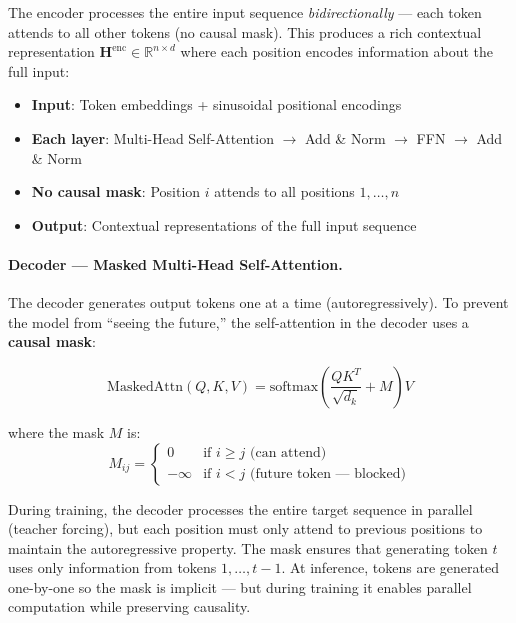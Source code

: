 The encoder processes the entire input sequence \emph{bidirectionally} --- each token attends to all other tokens (no causal mask). This produces a rich contextual representation $\mathbf{H}^{\text{enc}} \in \mathbb{R}^{n \times d}$ where each position encodes information about the full input:

\begin{itemize}
  \item \textbf{Input}: Token embeddings + sinusoidal positional encodings
  \item \textbf{Each layer}: Multi-Head Self-Attention $\to$ Add \& Norm $\to$ FFN $\to$ Add \& Norm
  \item \textbf{No causal mask}: Position $i$ attends to all positions $1, \ldots, n$
  \item \textbf{Output}: Contextual representations of the full input sequence
\end{itemize}

\paragraph{Decoder --- Masked Multi-Head Self-Attention.}
\label{decoder-masked-multi-head-self-attention.}

The decoder generates output tokens one at a time (autoregressively). To prevent the model from ``seeing the future,'' the self-attention in the decoder uses a \textbf{causal mask}:

\begin{equation}
  \text{MaskedAttn}(Q, K, V) = \text{softmax}\!\left(\frac{QK^T}{\sqrt{d_k}} + M\right) V
\end{equation}

where the mask $M$ is: 
\[
M_{ij} = \begin{cases} 0 & \text{if } i \geq j \text{ (can attend)} \\ -\infty & \text{if } i < j \text{ (future token --- blocked)} \end{cases}
\]

\begin{intuitionbox}
During training, the decoder processes the entire target sequence in parallel (teacher forcing), but each position must only attend to previous positions to maintain the autoregressive property. The mask ensures that generating token $t$ uses only information from tokens $1, \ldots, t{-}1$. At inference, tokens are generated one-by-one so the mask is implicit --- but during training it enables parallel computation while preserving causality.
\end{intuitionbox}

